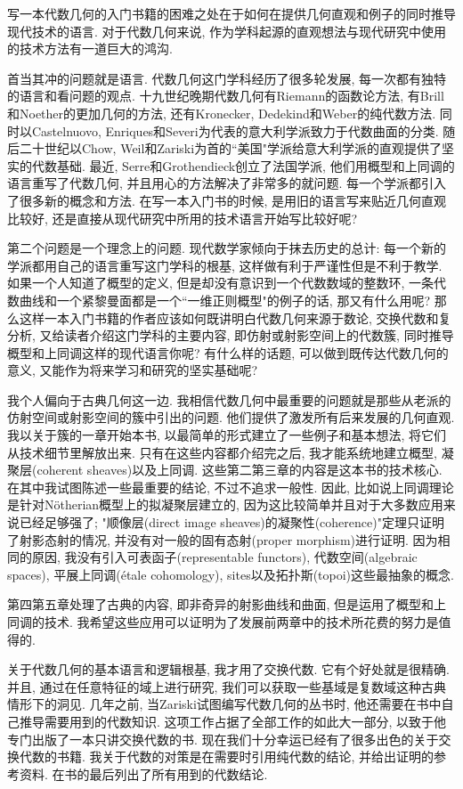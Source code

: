 写一本代数几何的入门书籍的困难之处在于如何在提供几何直观和例子的同时推导现代技术的语言. 对于代数几何来说, 作为学科起源的直观想法与现代研究中使用的技术方法有一道巨大的鸿沟.

首当其冲的问题就是语言. 代数几何这门学科经历了很多轮发展, 每一次都有独特的语言和看问题的观点. 十九世纪晚期代数几何有Riemann的函数论方法, 有Brill和Noether的更加几何的方法, 还有Kronecker, Dedekind和Weber的纯代数方法. 同时以Castelnuovo, Enriques和Severi为代表的意大利学派致力于代数曲面的分类. 随后二十世纪以Chow, Weil和Zariski为首的``美国"学派给意大利学派的直观提供了坚实的代数基础. 最近, Serre和Grothendieck创立了法国学派, 他们用概型和上同调的语言重写了代数几何, 并且用心的方法解决了非常多的就问题. 每一个学派都引入了很多新的概念和方法. 在写一本入门书的时候, 是用旧的语言写来贴近几何直观比较好, 还是直接从现代研究中所用的技术语言开始写比较好呢?

第二个问题是一个理念上的问题. 现代数学家倾向于抹去历史的总计: 每一个新的学派都用自己的语言重写这门学科的根基, 这样做有利于严谨性但是不利于教学. 如果一个人知道了概型的定义, 但是却没有意识到一个代数数域的整数环, 一条代数曲线和一个紧黎曼面都是一个``一维正则概型"的例子的话, 那又有什么用呢? 那么这样一本入门书籍的作者应该如何既讲明白代数几何来源于数论, 交换代数和复分析, 又给读者介绍这门学科的主要内容, 即仿射或射影空间上的代数簇, 同时推导概型和上同调这样的现代语言你呢? 有什么样的话题, 可以做到既传达代数几何的意义, 又能作为将来学习和研究的坚实基础呢?

\bigskip

我个人偏向于古典几何这一边. 我相信代数几何中最重要的问题就是那些从老派的仿射空间或射影空间的簇中引出的问题. 他们提供了激发所有后来发展的几何直观. 我以关于簇的一章开始本书, 以最简单的形式建立了一些例子和基本想法, 将它们从技术细节里解放出来. 只有在这些内容都介绍完之后, 我才能系统地建立概型, 凝聚层(coherent sheaves)以及上同调. 这些第二第三章的内容是这本书的技术核心. 在其中我试图陈述一些最重要的结论, 不过不追求一般性. 因此, 比如说上同调理论是针对N\"otherian概型上的拟凝聚层建立的, 因为这比较简单并且对于大多数应用来说已经足够强了; "顺像层(direct image sheaves)的凝聚性(coherence)"定理只证明了射影态射的情况, 并没有对一般的固有态射(proper morphism)进行证明. 因为相同的原因, 我没有引入可表函子(representable functors), 代数空间(algebraic spaces), 平展上同调(\'etale cohomology), sites以及拓扑斯(topoi)这些最抽象的概念.

第四第五章处理了古典的内容, 即非奇异的射影曲线和曲面, 但是运用了概型和上同调的技术. 我希望这些应用可以证明为了发展前两章中的技术所花费的努力是值得的.

关于代数几何的基本语言和逻辑根基, 我才用了交换代数. 它有个好处就是很精确. 并且, 通过在任意特征的域上进行研究, 我们可以获取一些基域是复数域这种古典情形下的洞见. 几年之前, 当Zariski试图编写代数几何的丛书时, 他还需要在书中自己推导需要用到的代数知识. 这项工作占据了全部工作的如此大一部分, 以致于他专门出版了一本只讲交换代数的书. 现在我们十分幸运已经有了很多出色的关于交换代数的书籍. 我关于代数的对策是在需要时引用纯代数的结论, 并给出证明的参考资料. 在书的最后列出了所有用到的代数结论.

